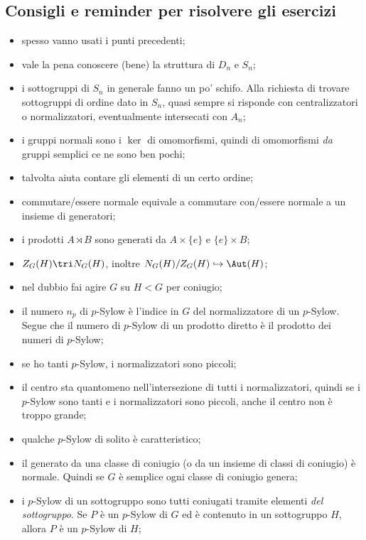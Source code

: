 \subsection{Consigli e reminder per risolvere gli esercizi}
\begin{itemize}
    \item spesso vanno usati i punti precedenti;
    \item vale la pena conoscere (bene) la struttura di $D_n$ e $S_n$;
    \item i sottogruppi di $S_n$ in generale fanno un po' schifo. Alla richiesta di trovare sottogruppi di ordine dato in $S_n$, quasi sempre si risponde con centralizzatori o normalizzatori, eventualmente intersecati con $A_n$;
    \item i gruppi normali sono i $\ker$ di omomorfismi, quindi di omomorfismi \textit{da} gruppi semplici ce ne sono ben pochi;
    \item talvolta aiuta contare gli elementi di un certo ordine;
    \item commutare/essere normale equivale a commutare con/essere normale a un insieme di generatori;
    \item i prodotti $A \rtimes B$ sono generati da $A \times \{e\}$ e $\{e\} \times B$;
    \item $Z_G(H) \tri N_G(H)$, inoltre $N_G(H) / Z_G(H) \hookrightarrow \Aut(H)$;
    \item nel dubbio fai agire $G$ su $H < G$ per coniugio;
    \item il numero $n_p$ di $p$-Sylow è l'indice in $G$ del normalizzatore di un $p$-Sylow. Segue che il numero di $p$-Sylow di un prodotto diretto è il prodotto dei numeri di $p$-Sylow;
    \item se ho tanti $p$-Sylow, i normalizzatori sono piccoli;
    \item il centro sta quantomeno nell'intersezione di tutti i normalizzatori, quindi se i $p$-Sylow sono tanti e i normalizzatori sono piccoli, anche il centro non è troppo grande;
    \item qualche $p$-Sylow di solito è caratteristico;
    \item il generato da una classe di coniugio (o da un insieme di classi di coniugio) è normale. Quindi se $G$ è semplice ogni classe di coniugio genera;
    \item i $p$-Sylow di un sottogruppo sono tutti coniugati tramite elementi \textit{del sottogruppo}. Se $P$ è un $p$-Sylow di $G$ ed è contenuto in un sottogruppo $H$, allora $P$ è un $p$-Sylow di $H$;

\end{itemize}
